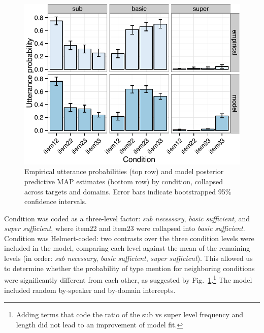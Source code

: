 \documentclass[10pt,letterpaper]{article}
\newcommand{\figref}[1]{Fig.~\ref{#1}}
\begin{document}
\begin{figure}[bt]
\centering
\includegraphics[width=.5\textwidth]{graphs/qualitativepattern}
\caption{Empirical utterance probabilities (top row) and model posterior predictive MAP estimates (bottom row) by condition, collapsed across targets and domains. Error bars indicate bootstrapped 95\% confidence intervals.}
\label{fig:qualitativemodel}
\end{figure}

Condition was coded as a three-level factor: \emph{sub necessary}, \emph{basic sufficient}, and \emph{super sufficient}, where item22 and item23 were collapsed into \emph{basic sufficient}. Condition was Helmert-coded: two contrasts over the three condition levels were included in the model, comparing each level against the mean of the remaining levels (in order: \emph{sub necessary}, \emph{basic sufficient}, \emph{super sufficient}). This allowed us to determine whether the probability of type mention  for neighboring conditions were significantly different from each other, as suggested by \figref{fig:qualitativemodel}.\footnote{Adding terms that code the ratio of the sub vs super level frequency and length did not lead to an improvement of model fit.} The model included random by-speaker and by-domain intercepts. 
\end{document}
